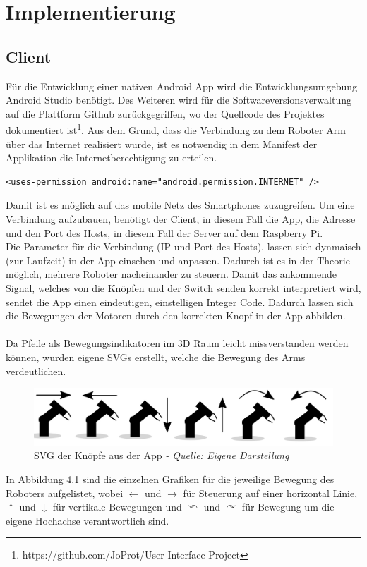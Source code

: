 \documentclass[12pt,					%
							 oneside,			%
							 a4paper,			%
							 halfparskip,		%
							 liststotoc,			%
							 bibtotoc,			%
							 fleqn,				%
							 pointlessnumbers]	%
							 {scrreprt}
\begin{document}
\chapter{Implementierung}	
\section{Client}
Für die Entwicklung einer nativen Android App wird die Entwicklungsumgebung Android Studio benötigt. Des Weiteren wird für die Softwareversionsverwaltung auf die Plattform Github zurückgegriffen, wo der Quellcode des Projektes dokumentiert ist\footnote{https://github.com/JoProt/User-Interface-Project}. Aus dem Grund, dass die Verbindung zu dem Roboter Arm über das Internet realisiert wurde, ist es notwendig in dem Manifest der Applikation die Internetberechtigung zu erteilen. \\
\begin{lstlisting}
<uses-permission android:name="android.permission.INTERNET" />
\end{lstlisting}

Damit ist es möglich auf das mobile Netz des Smartphones zuzugreifen. Um eine Verbindung aufzubauen, benötigt der Client, in diesem Fall die App, die Adresse und den Port des Hosts, in diesem Fall der Server auf dem Raspberry Pi. \\
Die Parameter für die Verbindung (IP und Port des Hosts), lassen sich dynmaisch (zur Laufzeit) in der App einsehen und anpassen. Dadurch ist es in der Theorie möglich, mehrere Roboter nacheinander zu steuern. 
Damit das ankommende Signal, welches von die Knöpfen und der Switch senden korrekt interpretiert wird, sendet die App einen eindeutigen, einstelligen Integer Code. Dadurch lassen sich die Bewegungen der Motoren durch den korrekten Knopf in der App abbilden. \\ \\
Da Pfeile als Bewegungsindikatoren im 3D Raum leicht missverstanden werden können, wurden eigene SVGs erstellt, welche die Bewegung des Arms verdeutlichen. \\
\begin{figure}[h]
	\centering
	\includegraphics[scale=0.3]{pictures/robissvg.jpg}
	\caption{SVG der Knöpfe aus der App \textit{- Quelle: Eigene Darstellung}}
\end{figure}
\newpage
In Abbildung 4.1 sind die einzelnen Grafiken für die jeweilige Bewegung des Roboters aufgelistet, wobei $\leftarrow$ und $\rightarrow$ für Steuerung auf einer horizontal Linie, $\uparrow$ und $\downarrow$ für vertikale Bewegungen und $\curvearrowleft$ und $\curvearrowright$ für Bewegung um die eigene Hochachse verantwortlich sind.
\end{document}
